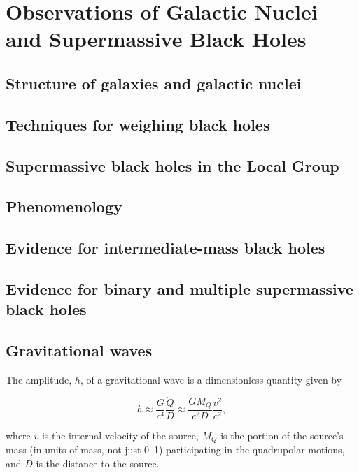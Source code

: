 \documentclass[degn-notes.tex]{subfiles}
\begin{document}
\setcounter{chapter}{1}

\chapter{Observations of Galactic Nuclei and Supermassive Black Holes}

\section{Structure of galaxies and galactic nuclei}

\section{Techniques for weighing black holes}

\section{Supermassive black holes in the Local Group}

\section{Phenomenology}

\section{Evidence for intermediate-mass black holes}

\section{Evidence for binary and multiple supermassive black holes}

\section{Gravitational waves}

The amplitude, $h$, of a gravitational wave is a dimensionless quantity given by

\begin{displaymath}
  h \approx
  \frac{G}{c^4} \frac{\ddot{Q}}{D} \approx
  \frac{G M_Q}{c^2 D} \frac{v^2}{c^2},
%
  \tag{Merritt 2.55}
  \label{merritt:2.55}
\end{displaymath}

where $v$ is the internal velocity of the source, $M_Q$ is the portion of the source's mass (in units of mass, not just 0--1) participating in the quadrupolar motions, and $D$ is the distance to the source.
\end{document}
